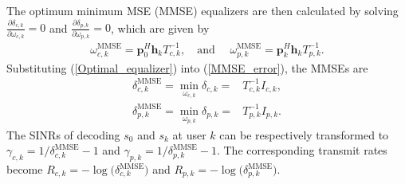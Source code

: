 \documentclass[10pt,journal,twocolumn]{IEEEtran}
\begin{document}
The optimum minimum MSE (MMSE) equalizers are then calculated by solving $\frac{\partial \delta_{c,k}}{\partial \omega_{c,k}}=0$ and $\frac{\partial \delta_{p,k}}{\partial \omega_{p,k}}=0$, which are given by 
\begin{align}
\omega^{\text{MMSE}}_{c,k}=\mathbf{p}^H_0\mathbf{h}_kT^{-1}_{c,k}, \quad \text{and }\quad\omega^{\text{MMSE}}_{p,k}=\mathbf{p}^H_k\mathbf{h}_kT^{-1}_{p,k}.
\label{Optimal_equalizer}
\end{align}
Substituting (\ref{Optimal_equalizer}) into (\ref{MMSE_error}), the MMSEs are 
\begin{subequations}
\begin{align}
\delta^{\text{MMSE}}_{c,k} =\min_{\omega_{c,k}}\delta_{c,k}= &T^{-1}_{c,k}I_{c,k},\\
\delta^{\text{MMSE}}_{p,k} =\min_{\omega_{p,k}}\delta_{p,k}= &T^{-1}_{p,k}I_{p,k}.
\label{MMSE_error2}
\end{align}
\end{subequations}
The SINRs of decoding $s_0$ and $s_k$ at user $k$ can be respectively transformed  to $\gamma_{c,k}=1/\delta^{\text{MMSE}}_{c,k}-1$ and $\gamma_{p,k}=1/\delta^{\text{MMSE}}_{p,k}-1$.  The corresponding transmit rates become $R_{c,k}=-\log\big(\delta^{\text{MMSE}}_{c,k}\big)$ and $R_{p,k}=-\log\big(\delta^{\text{MMSE}}_{p,k}\big)$.
\end{document}

